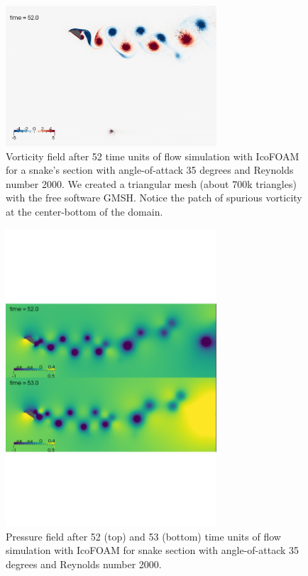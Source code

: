 \documentclass[9pt,twocolumn,twoside]{article}
\begin{document}
\begin{figure}
\centering
\includegraphics[width=0.7\textwidth]{./figures/openfoam/openfoam_vorticity52Re2000AoA35_gmshZeroGradient.pdf}
\caption{
Vorticity field after 52 time units of flow simulation with IcoFOAM for a snake's section with angle-of-attack 35 degrees and Reynolds number 2000.
We created a triangular mesh (about 700k triangles) with the free software GMSH. 
Notice the patch of spurious vorticity at the center-bottom of the domain.
}
\label{figure1}
\end{figure}


\begin{figure}
\centering
\includegraphics[width=0.7\textwidth]{./figures/openfoam/openfoam_pressureRe2000AoA35_gmshZeroGradient.pdf}
\caption{
Pressure field after 52 (top) and 53 (bottom) time units of flow simulation with IcoFOAM for snake section with angle-of-attack 35 degrees and Reynolds number 2000.
}
\label{figure2}
\end{figure}
\end{document}

